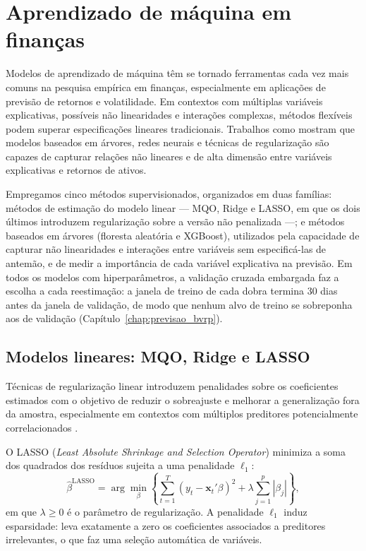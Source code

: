 \section{Aprendizado de máquina em finanças}

Modelos de aprendizado de máquina têm se tornado ferramentas cada vez mais
comuns na pesquisa empírica em finanças, especialmente em aplicações de previsão
de retornos e volatilidade. Em contextos com múltiplas variáveis explicativas,
possíveis não linearidades e interações complexas, métodos flexíveis podem
superar especificações lineares tradicionais. Trabalhos como \citet{Gu2020EmpiricalML}
mostram que modelos baseados em árvores, redes neurais e técnicas de regularização
são capazes de capturar relações não lineares e de alta dimensão entre
variáveis explicativas e retornos de ativos.

Empregamos cinco métodos supervisionados, organizados em duas
famílias: métodos de estimação do modelo linear --- MQO, Ridge e LASSO, em que os dois
últimos introduzem regularização sobre a versão não penalizada ---; e métodos
baseados em árvores (floresta aleatória e XGBoost),
utilizados pela capacidade de capturar não linearidades e interações entre
variáveis sem especificá-las de antemão, e de medir a importância de cada
variável explicativa na previsão. Em todos os modelos com hiperparâmetros, a validação
cruzada embargada faz a escolha a cada reestimação: a janela de treino de
cada dobra termina 30 dias antes da janela de validação, de modo que nenhum
alvo de treino se sobreponha aos de validação (Capítulo~\ref{chap:previsao_bvrp}).

\subsection{Modelos lineares: MQO, Ridge e LASSO}

Técnicas de regularização linear introduzem penalidades sobre os coeficientes
estimados com o objetivo de reduzir o sobreajuste e melhorar a
generalização fora da amostra, especialmente em contextos com múltiplos
preditores potencialmente correlacionados \citep{tibshirani1996lasso}.

O LASSO (\textit{Least Absolute Shrinkage and Selection Operator}) minimiza a
soma dos quadrados dos resíduos sujeita a uma penalidade $\ell_1$:
\[
\hat{\beta}^{\text{LASSO}} = \arg\min_{\beta}
    \left\{ \sum_{t=1}^{T}(y_t - \mathbf{x}_t'\beta)^2
            + \lambda \sum_{j=1}^{p} |\beta_j| \right\},
\]
em que $\lambda \geq 0$ é o parâmetro de regularização. A penalidade $\ell_1$
induz esparsidade: leva exatamente a zero os coeficientes associados a
preditores irrelevantes, o que faz uma seleção automática de variáveis.

